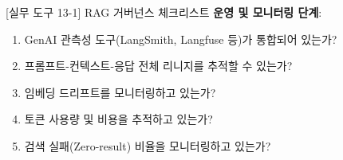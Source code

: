 \begin{practicaltool}{[실무 도구 13-1] RAG 거버넌스 체크리스트}
\textbf{운영 및 모니터링 단계}:
\begin{enumerate}
 \item GenAI 관측성 도구(LangSmith, Langfuse 등)가 통합되어 있는가?
 \item 프롬프트-컨텍스트-응답 전체 리니지를 추적할 수 있는가?
 \item 임베딩 드리프트를 모니터링하고 있는가?
 \item 토큰 사용량 및 비용을 추적하고 있는가?
 \item 검색 실패(Zero-result) 비율을 모니터링하고 있는가?
\end{enumerate}
\end{practicaltool}


